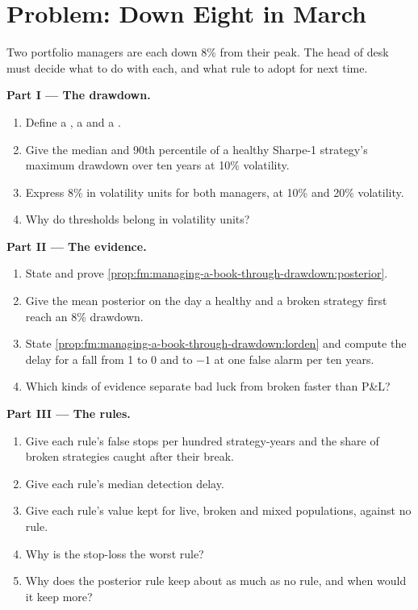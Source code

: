 \section{Problem: Down Eight in March}

\begin{problem}\label{pb:fm:managing-a-book-through-drawdown:1}
Two portfolio managers are each down 8\% from their peak. The head of desk must decide what to do with each, and what rule to adopt for next time.

\medskip\noindent\textbf{Part I --- The drawdown.}
\begin{enumerate}
\item Define a , a  and a .
\item Give the median and 90th percentile of a healthy Sharpe-1 strategy's maximum drawdown over ten years at 10\% volatility.
\item Express 8\% in volatility units for both managers, at 10\% and 20\% volatility.
\item Why do thresholds belong in volatility units?
\end{enumerate}

\medskip\noindent\textbf{Part II --- The evidence.}
\begin{enumerate}[resume]
\item State and prove \cref{prop:fm:managing-a-book-through-drawdown:posterior}.
\item Give the mean posterior on the day a healthy and a broken strategy first reach an 8\% drawdown.
\item State \cref{prop:fm:managing-a-book-through-drawdown:lorden} and compute the delay for a fall from 1 to 0 and to $-1$ at one false alarm per
ten years.
\item Which kinds of evidence separate bad luck from broken faster than P\&L?
\end{enumerate}

\medskip\noindent\textbf{Part III --- The rules.}
\begin{enumerate}[resume]
\item Give each rule's false stops per hundred strategy-years and the share of broken strategies caught after their break.
\item Give each rule's median detection delay.
\item Give each rule's value kept for live, broken and mixed populations, against no rule.
\item Why is the stop-loss the worst rule?
\item Why does the posterior rule keep about as much as no rule, and when would it keep more?
\end{enumerate}


\end{problem}
